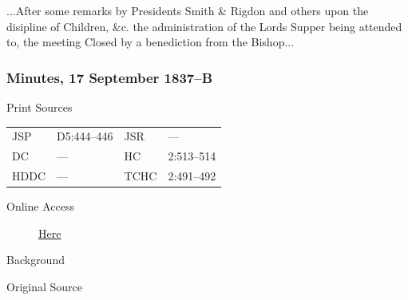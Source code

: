 					...After some remarks by Presidents Smith \& Rigdon and others upon the disipline of Children, \&c. the administration of the Lords Supper being attended to, the meeting Closed by a benediction from the Bishop...
					
		\subsubsection{Minutes, 17 September 1837--B}
			\label{EMS-1837-JS-17-SEP-1837-B}
			
			\begin{description}
					\item[Print Sources]
				\end{description}

					\begin{tabular}{p{0.5in}p{1in}p{0.5in}p{1in}}
					JSP	 	& D5:444--446		& JSR 		& --- \\
					DC	 	& ---				& HC 		& 2:513--514 \\
					HDDC 	& ---				& TCHC 		& 2:491--492 \\
					\end{tabular}
				
				\begin{description}
					\item[Online Access] \href{https://www.josephsmithpapers.org/paper-summary/minutes-17-september-1837-b/1}{Here}
				\end{description}
				
				\begin{description}
					\item[Background]
				\end{description}
				
				
				\begin{description}
					\item[Original Source]
				\end{description}
				
				

